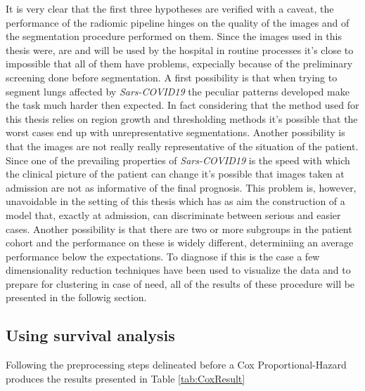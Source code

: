 It is very clear that the first three hypotheses are verified with a caveat, the performance of the radiomic pipeline hinges on the quality of the images and of the segmentation procedure performed on them. Since the images used in this thesis were, are and will be used by the hospital in routine processes it's close to impossible that all of them have problems, expecially because of the preliminary screening done before segmentation.
A first possibility is that when trying to segment lungs affected by \textit{Sars-COVID19} the peculiar patterns developed make the task much harder then expected.
In fact considering that the method used for this thesis relies on region growth and thresholding methods it's possible that the worst cases end up with unrepresentative segmentations.
Another possibility is that the images are not really really representative of the situation of the patient. Since one of the prevailing properties of \textit{Sars-COVID19} is the speed with which the clinical picture of the patient can change it's possible that images taken at admission are not as informative of the final prognosis. This problem is, however, unavoidable in the setting of this thesis which has as aim the construction of a model that, exactly at admission, can discriminate between serious and easier cases.
Another possibility is that there are two or more subgroups in the patient cohort and the performance on these is widely different, determiniing an average performance below the expectations.
To diagnose if this is the case a few dimensionality reduction techniques have been used to visualize the data and to prepare for clustering in case of need, all of the results of these procedure will be presented in the followig section.

\subsection{Using survival analysis}
Following the preprocessing steps delineated before a Cox Proportional-Hazard produces the results presented in Table \ref{tab:CoxResult}

